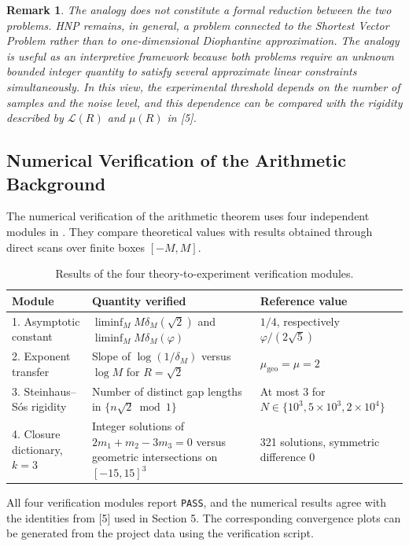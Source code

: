 \documentclass[11pt,a4paper]{article}
\newtheorem{remark}[theorem]{Remark}
\begin{document}
\begin{remark}
The analogy does not constitute a formal reduction between the two problems. HNP remains, in general, a problem connected to the Shortest Vector Problem rather than to one-dimensional Diophantine approximation. The analogy is useful as an interpretive framework because both problems require an unknown bounded integer quantity to satisfy several approximate linear constraints simultaneously. In this view, the experimental threshold depends on the number of samples and the noise level, and this dependence can be compared with the rigidity described by $\mathcal L(R)$ and $\mu(R)$ in [5].
\end{remark}

\subsection{Numerical Verification of the Arithmetic Background}

The numerical verification of the arithmetic theorem uses four independent modules in . They compare theoretical values with results obtained through direct scans over finite boxes $[-M,M]$.

\begin{table}[H]
\centering
\caption{Results of the four theory-to-experiment verification modules.}
\begin{tabular}{p{}p{}p{}}
\toprule
\textbf{Module} & \textbf{Quantity verified} & \textbf{Reference value}\\
\midrule
1. Asymptotic constant &
$\liminf_M M\delta_M(\sqrt2)$ and $\liminf_M M\delta_M(\varphi)$ &
$1/4$, respectively $\varphi/(2\sqrt5)$\\
2. Exponent transfer &
Slope of $\log(1/\delta_M)$ versus $\log M$ for $R=\sqrt2$ &
$\mu_{\mathrm{geo}}=\mu=2$\\
3. Steinhaus--Sós rigidity &
Number of distinct gap lengths in $\{n\sqrt2\bmod1\}$ &
At most 3 for $N\in\{10^3,5\times10^3,2\times10^4\}$\\
4. Closure dictionary, $k=3$ &
Integer solutions of $2m_1+m_2-3m_3=0$ versus geometric intersections on $[-15,15]^3$ &
321 solutions, symmetric difference 0\\
\bottomrule
\end{tabular}
\end{table}

All four verification modules report \texttt{PASS}, and the numerical results agree with the identities from [5] used in Section 5. The corresponding convergence plots can be generated from the project data using the verification script.
\end{document}
